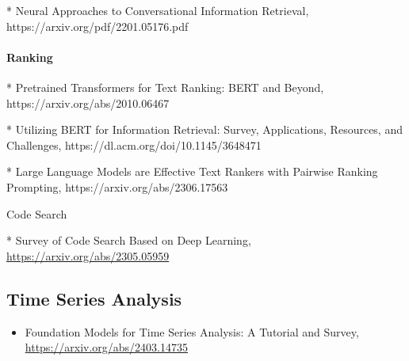 * Neural Approaches to Conversational Information Retrieval, https://arxiv.org/pdf/2201.05176.pdf

\paragraph{Ranking}

* Pretrained Transformers for Text Ranking: BERT and Beyond, https://arxiv.org/abs/2010.06467

* Utilizing BERT for Information Retrieval: Survey, Applications, Resources, and Challenges, https://dl.acm.org/doi/10.1145/3648471

* Large Language Models are Effective Text Rankers with Pairwise Ranking Prompting, https://arxiv.org/abs/2306.17563

Code Search

* Survey of Code Search Based on Deep Learning, \url{https://arxiv.org/abs/2305.05959}

\subsection{Time Series Analysis}

\begin{itemize}
\item Foundation Models for Time Series Analysis: A Tutorial and Survey, \url{https://arxiv.org/abs/2403.14735}
\end{itemize}

